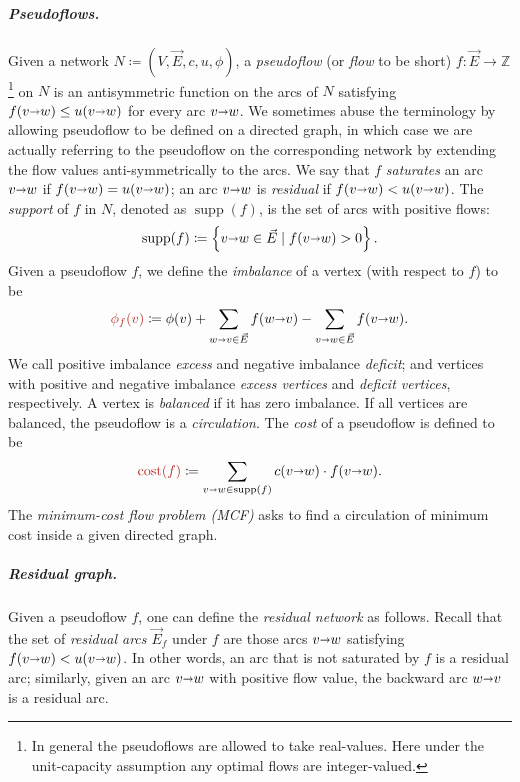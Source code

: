\documentclass[a4paper,UKenglish]{socg-lipics-v2018}
\makeatletter
\def\ints{\mathbb{Z}}
\def\Set#1{\left\{ #1 \right\}}
\def\fsupply{\phi}
\def\arcto{\mathord\shortrightarrow}
\def\arc#1#2{#1\arcto#2}
\def\cost{\operatorname{cost}}
\def\supp{\operatorname{supp}}
\theoremstyle{plain}
\numberwithin{figure}{section}
\renewcommand{\paragraph}{\subparagraph}
\def\EMPH#1{\textcolor{BrickRed}{{\emph{#1}}}}
\def\n@te#1{\textsf{\boldmath \textbf{$\langle\!\langle$#1$\rangle\!\rangle$}}\leavevmode}
\def\note#1{\textcolor{red}{\n@te{#1}}}
\renewcommand{\note}[1]{} %
\makeatother
\begin{document}
\begin{toappendix}
\paragraph{Pseudoflows.}
Given a network $N \coloneqq (V,\vec{E},c,u,\fsupply)$,
a \EMPH{pseudoflow} (or \EMPH{flow} to be short) $f\colon \vec{E} \to \ints$%
\footnote{In general the pseudoflows are allowed to take real-values. Here under the unit-capacity assumption any optimal flows are integer-valued.}
on $N$ is an antisymmetric function on the arcs of $N$ satisfying $f(\arc vw) \leq u(\arc vw)$ for every arc $\arc vw$.%
%
We sometimes abuse the terminology by allowing pseudoflow to be defined on a directed graph, in which case we are actually referring to the pseudoflow on the corresponding network by extending the flow values anti-symmetrically to the arcs.
%
We say that $f$ \EMPH{saturates} an arc $\arc vw$ if $f(\arc vw) = u(\arc vw)$; an arc $\arc vw$ is \EMPH{residual} if $f(\arc vw) < u(\arc vw)$.
The \EMPH{support} of $f$ in $N$, denoted as \EMPH{$\supp(f)$}, is the set of arcs with positive flows:
\[
\supp(f) \coloneqq \Set{\arc vw \in \vec{E} \mid f(\arc vw) > 0}.
\]
%
Given a pseudoflow $f$, we define the \EMPH{imbalance} of a vertex (with respect to $f$) to be
\[
\EMPH{$\fsupply_f (v)$} \coloneqq \fsupply(v) + \sum_{\arc wv \in \vec{E}}{f(\arc wv)} - \sum_{\arc vw \in \vec{E}}{f(\arc vw)}.
\]
We call positive imbalance \EMPH{excess} and negative imbalance \EMPH{deficit};
and vertices with positive and negative imbalance \EMPH{excess vertices} and
\EMPH{deficit vertices}, respectively.
A vertex is \EMPH{balanced} if it has zero imbalance.
If all vertices are balanced, the pseudoflow is a \EMPH{circulation}.
The \EMPH{cost} of a pseudoflow
is defined to be
\[
 \EMPH{$\cost(f)$} \coloneqq \sum_{\arc vw \in \supp(f)} c(\arc vw) \cdot f(\arc vw).
\]
%
The \EMPH{minimum-cost flow problem (MCF)} asks to find a circulation of minimum cost inside a given directed graph.

\paragraph{Residual graph.}
Given a pseudoflow $f$, one can define the \emph{residual network} as follows.
%
Recall that the set of \emph{residual arcs $\vec{E}_f$} under $f$ are those arcs $\arc vw$ satisfying $f(\arc vw) < u(\arc vw)$.  In other words, an arc that is not saturated by $f$ is a residual arc; similarly, given an arc $\arc vw$ with positive flow value, the backward arc $\arc wv$ is a residual arc.


\end{toappendix}
\end{document}
